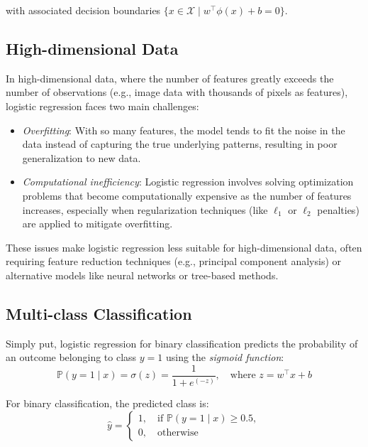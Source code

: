with associated decision boundaries $\{x \in \mathcal{X} \mid w^\top \phi(x) +b =0 \}$.

\subsection{High-dimensional Data}
In high-dimensional data, where the number of features greatly exceeds the number of observations (e.g., image data with thousands of pixels as features), logistic regression faces two main challenges:
\begin{itemize}
    \item \emph{Overfitting}: With so many features, the model tends to fit the noise in the data instead of capturing the true underlying patterns, resulting in poor generalization to new data.
    \item \emph{Computational inefficiency}: Logistic regression involves solving optimization problems that become computationally expensive as the number of features increases, especially when regularization techniques (like $\ell_1$ or $\ell_2$ penalties) are applied to mitigate overfitting.
\end{itemize}

These issues make logistic regression less suitable for high-dimensional data, often requiring feature reduction techniques (e.g., principal component analysis) or alternative models like neural networks or tree-based methods.

\subsection{Multi-class Classification}
Simply put, logistic regression for binary classification predicts the probability of an outcome belonging to class $y=1$ using the \emph{sigmoid function}:
\begin{equation}
    \mathbb{P}(y=1\mid x) = \sigma(z) = \frac{1}{1 + e^{(-z)}},\quad \text{where }z = w^\top x+b
    \label{eqn:20}
\end{equation}

For binary classification, the predicted class is:
\begin{equation}
    \hat{y}=
    \begin{cases}
        1, \quad \text{if } \mathbb{P}(y=1\mid x) \geq 0.5,\\
        0, \quad \text{otherwise}
    \end{cases}
    \label{eqn:21}
\end{equation}

